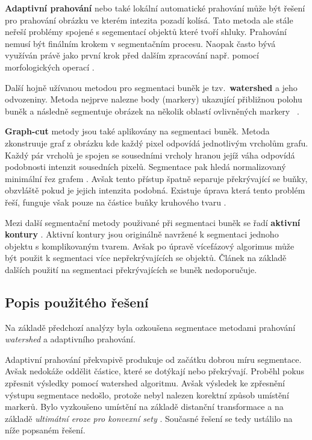 \documentclass[11pt,twoside,a4paper,table]{book}
\begin{document}
\textbf{Adaptivní prahování} nebo také lokální automatické prahování může být řešení pro prahování obrázku ve kterém intezita pozadí kolísá. Tato metoda ale stále neřeší problémy spojené s segementací objektů které tvoří shluky. Prahování nemusí být finálním krokem v segmentačním procesu. Naopak často bývá využíván právě jako první krok před dalším zpracování např. pomocí morfologických operací \cite{book:imgproc_gonzalez} \cite{art:wahlby}.

Další hojně užívanou metodou pro segmentaci buněk je tzv.~\textbf{watershed} a jeho odvozeniny. Metoda nejprve nalezne body (markery) ukazující přibližnou polohu buněk a následně segmentuje obrázek na několik oblastí ovlivněných markery~\cite{art:watershed1} \cite{art:watershed2}\cite{art:watershed3}\cite{art:wahlby}.

\textbf{Graph-cut} metody jsou také aplikovány na segmentaci buněk. Metoda zkonstruuje graf z obrázku kde každý pixel odpovídá jednotlivým vrcholům grafu. Každý pár vrcholů je spojen se sousedními vrcholy hranou jejíž váha odpovídá podobnosti intenzit sousedních pixelů. Segmentace pak hledá normalizovaný minimální řez grafem \cite{art:grabcut1}. Avšak tento přístup špatně separuje překrývající se buňky, obzvláště pokud je jejich intenzita podobná. Existuje úprava která tento problém řeší, funguje však pouze na částice buňky kruhového tvaru \cite{art:ultimate}.

Mezi další segmentační metody použivané při segmentaci buněk se řadí \textbf{aktivní kontury} \cite{art:active_contours1} \cite{art:active_contours2}. Aktivní kontury jsou originálně navržené k segmentaci jednoho objektu s komplikovaným tvarem. Avšak po úpravě vícefázový algorimus může být použit k segmentaci více nepřekrývajících se objektů. Článek \cite{art:ultimate} na základě dalších použití na segmentaci překrývajících se buněk nedoporučuje.

\subsection{Popis použitého řešení}

Na základě předchozí analýzy byla ozkoušena segmentace metodami prahování \textit{watershed} a adaptivního prahování.

Adaptivní prahování překvapivě produkuje od začátku dobrou míru segmentace. Avšak nedokáže oddělit částice, které se dotýkají nebo překrývají. Proběhl pokus zpřesnit výsledky pomocí watershed algoritmu. Avšak výsledek ke zpřesnění výstupu segmentace nedošlo, protože nebyl nalezen korektní způsob umístění markerů. Bylo vyzkoušeno umístění na základě distanční transformace \cite{opencv:watertut} a na základě \textit{ultimátní eroze pro konvexní sety } \cite{art:ultimate}. Současné řešení se tedy ustálilo na níže popsaném řešení.
\end{document}
